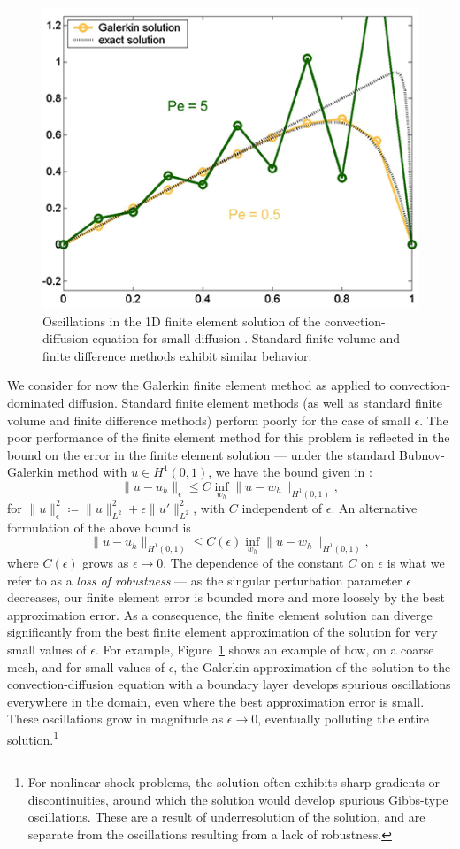 \begin{figure}[!h]
\centering
\includegraphics[scale=.4]{figs/GalerkinOscTight.png}
\caption{Oscillations in the 1D finite element solution of the convection-diffusion equation for small diffusion \cite{GalerkinOsc}. Standard finite volume and finite difference methods exhibit similar behavior.}
\label{fig:GalerkinOsc}
\end{figure}
We consider for now the Galerkin finite element method as applied to convection-dominated diffusion.  Standard finite element methods (as well as standard finite volume and finite difference methods) perform poorly for the case of small $\epsilon$.  The poor performance of the finite element method for this problem is reflected in the bound on the error in the finite element solution --- under the standard Bubnov-Galerkin method with $u\in H^1(0,1)$, we have the bound given in \cite{roos2008robust}:
\[
\|u-u_h\|_\epsilon \leq C \inf_{w_h}\|u-w_h\|_{H^1(0,1)},
\]
for $\|u\|_\epsilon^2 \coloneqq \|u\|_{L^2}^2 + \epsilon \|u'\|_{L^2}^2$, with $C$ independent of $\epsilon$. An alternative formulation of the above bound is 
\[
\|u-u_h\|_{H^1(0,1)} \leq C(\epsilon) \inf_{w_h}\|u-w_h\|_{H^1(0,1)},
\]
where $C(\epsilon)$ grows as $\epsilon\rightarrow 0$. The dependence of the constant $C$ on $\epsilon$ is what we refer to as a \textit{loss of robustness} --- as the singular perturbation parameter $\epsilon$ decreases, our finite element error is bounded more and more loosely by the best approximation error.  As a consequence, the finite element solution can diverge significantly from the best finite element approximation of the solution for very small values of $\epsilon$.  For example, Figure~\ref{fig:GalerkinOsc} shows an example of how, on a coarse mesh, and for small values of $\epsilon$, the Galerkin approximation of the solution to the convection-diffusion equation with a boundary layer develops spurious oscillations everywhere in the domain, even where the best approximation error is small.  These oscillations grow in magnitude as $\epsilon \rightarrow 0$, eventually polluting the entire solution.\footnote{For nonlinear shock problems, the solution often exhibits sharp gradients or discontinuities, around which the solution would develop spurious Gibbs-type oscillations. These are a result of underresolution of the solution, and are separate from the oscillations resulting from a lack of robustness.}

